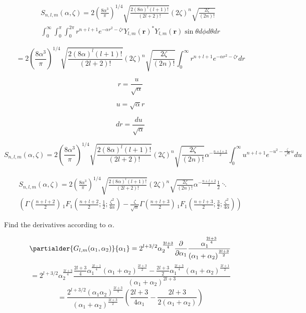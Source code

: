 \documentclass[12pt]{article}
\begin{document}
\begin{multline*}
  S_{n,l,m}(\alpha, \zeta) = 2\left(\frac{8\alpha^3}{\pi}\right)^{1/4} \sqrt{\frac{2(8\alpha)^l (l + 1)!}{(2l + 2)!}}\left(2\zeta\right)^n \sqrt{\frac{2\zeta}{(2n)!}} \\
  \int_0^\infty \int_0^\pi \int_0^{2\pi} r^{n + l + 1} e^{-\alpha r^2 - \zeta r} Y_{l,m}(\mathbf{r})^*Y_{l,m}(\mathbf{r})\sin\theta d\phi d\theta dr
\end{multline*}


$$ = 2\left(\frac{8\alpha^3}{\pi}\right)^{1/4} \sqrt{\frac{2(8\alpha)^l (l + 1)!}{(2l + 2)!}} (2\zeta)^n \sqrt{\frac{2\zeta}{(2n)!}} \int_0^\infty r^{n + l + 1} e^{-\alpha r^2 - \zeta r} dr$$

$$r = \frac{u}{\sqrt{\alpha}}$$

$$u = \sqrt{\alpha}r$$

$$dr = \frac{du}{\sqrt{\alpha}}$$

$$S_{n,l,m}(\alpha,\zeta) = 2\left(\frac{8\alpha^3}{\pi}\right)^{1/4} \sqrt{\frac{2(8\alpha)^l (l + 1)!}{(2l + 2)!}} (2\zeta)^n \sqrt{\frac{2\zeta}{(2n)!}} \alpha^{-\frac{n + l + 2}{2}} \int_0^\infty u^{n + l + 1} e^{-u^2 - \frac{\zeta}{\sqrt{\alpha}}u} du$$

\begin{multline*}
  S_{n,l,m}(\alpha, \zeta) = 2\left(\frac{8\alpha^3}{\pi}\right)^{1/4} \sqrt{\frac{2(8\alpha)^l (l + 1)!}{(2l + 2)!}} (2\zeta)^n \sqrt{\frac{2\zeta}{(2n)!}} \alpha^{-\frac{n + l + 2}{2}} \frac{1}{2} \ddots\\
  \left(\Gamma\left(\frac{n + l + 2}{2}\right)\,_1F_1\left(\frac{n + l + 2}{2}; \frac{1}{2}; \frac{\zeta^2}{4\alpha}\right) - \frac{\zeta}{\sqrt{\alpha}}\Gamma\left(\frac{n + l + 3}{2}\right)\, _1F_1\left(\frac{n + l + 3}{2}; \frac{3}{2}; \frac{\zeta^2}{4\alpha}\right)\right)
\end{multline*}

Find the derivatives according to $\alpha$.

$$\partialder{G_{l,m}(\alpha_1, \alpha_2)}{\alpha_1} = 2^{l + 3/2} \alpha_2^{\frac{2l + 3}{4}} \frac{\partial}{\partial \alpha_1} \frac{\alpha_1^{\frac{2l + 3}{4}}}{\left(\alpha_1 + \alpha_2\right)^{\frac{2l + 3}{2}}}$$
$$= 2^{l + 3/2} \alpha_2^{\frac{2l + 3}{4}} \frac{\frac{2l + 3}{4} \alpha_1^{\frac{2l - 1}{4}} \left(\alpha_1 + \alpha_2\right)^{\frac{2l + 3}{2}} - \frac{2l + 3}{2} \alpha_1^{\frac{2l + 3}{4}} \left(\alpha_1 + \alpha_2\right)^{\frac{2l + 1}{2}}}{\left(\alpha_1 + \alpha_2\right)^{2l + 3}}$$
$$= \frac{2^{l + 3/2} \left(\alpha_1\alpha_2\right)^{\frac{2l + 3}{4}}}{\left(\alpha_1 + \alpha_2\right)^{\frac{2l + 3}{2}}}\left(\frac{2l + 3}{4\alpha_1} - \frac{2l + 3}{2\left(\alpha_1 + \alpha_2\right)}\right)$$
\end{document}
